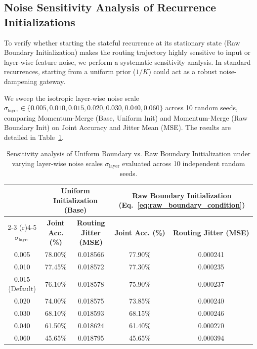 \documentclass{article}
\theoremstyle{plain}
\theoremstyle{definition}
\theoremstyle{remark}
\begin{document}
    \subsection{Noise Sensitivity Analysis of Recurrence Initializations}
    \label{app:noise_sensitivity}
    To verify whether starting the stateful recurrence at its stationary state (Raw Boundary Initialization) makes the routing trajectory highly sensitive to input or layer-wise feature noise, we perform a systematic sensitivity analysis. In standard recurrences, starting from a uniform prior ($1/K$) could act as a robust noise-dampening gateway.
    
    We sweep the isotropic layer-wise noise scale $\sigma_{\text{layer}} \in \{0.005, 0.010, 0.015, 0.020, 0.030, 0.040, 0.060\}$ across 10 random seeds, comparing Momentum-Merge (Base, Uniform Init) and Momentum-Merge (Raw Boundary Init) on Joint Accuracy and Jitter Mean (MSE). The results are detailed in Table~\ref{tab:noise_sensitivity_sweep}.

    \begin{table}[h]
    \centering
    \caption{Sensitivity analysis of Uniform Boundary vs. Raw Boundary Initialization under varying layer-wise noise scales $\sigma_{\text{layer}}$ evaluated across 10 independent random seeds.}
    \label{tab:noise_sensitivity_sweep}
    \vskip 0.1in
    \begin{tabular}{ccccc}
    \toprule
    & \multicolumn{2}{c}{\textbf{Uniform Initialization (Base)}} & \multicolumn{2}{c}{\textbf{Raw Boundary Initialization (Eq.~\ref{eq:raw_boundary_condition})}} \\
    \cmidrule(r){2-3} \cmidrule(r){4-5}
    $\sigma_{\text{layer}}$ & \textbf{Joint Acc. (\%)} & \textbf{Routing Jitter (MSE)} & \textbf{Joint Acc. (\%)} & \textbf{Routing Jitter (MSE)} \\
    \midrule
    0.005 & 78.00\% & 0.018566 & 77.90\% & 0.000241 \\
    0.010 & 77.45\% & 0.018572 & 77.30\% & 0.000235 \\
    0.015 (Default) & 76.10\% & 0.018578 & 75.90\% & 0.000237 \\
    0.020 & 74.00\% & 0.018575 & 73.85\% & 0.000240 \\
    0.030 & 68.10\% & 0.018593 & 68.15\% & 0.000246 \\
    0.040 & 61.50\% & 0.018624 & 61.40\% & 0.000270 \\
    0.060 & 45.65\% & 0.018795 & 45.65\% & 0.000394 \\
    \bottomrule
    \end{tabular}
    \end{table}
\end{document}
